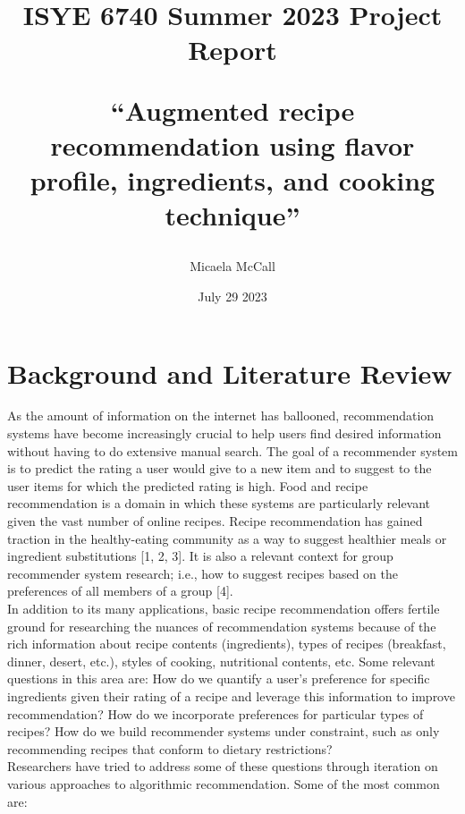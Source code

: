 \documentclass{article}
\begin{document}
\title{ISYE 6740 Summer 2023 Project Report 

``Augmented recipe recommendation using flavor profile, ingredients, and cooking technique''}
\author{Micaela McCall}
\date{July 29 2023}
\maketitle

\tableofcontents
\pagebreak

\section{Background and Literature Review}

As the amount of information on the internet has ballooned, recommendation systems have become increasingly crucial to help users find desired information without having to do extensive manual search. The goal of a recommender system is to predict the rating a user would give to a new item and to suggest to the user items for which the predicted rating is high. Food and recipe recommendation is a domain in which these systems are particularly relevant given the vast number of online recipes. Recipe recommendation has gained traction in the healthy-eating community as a way to suggest healthier meals or ingredient substitutions [1, 2, 3]. It is also a relevant context for group recommender system research; i.e., how to suggest recipes based on the preferences of all members of a group [4]. %
\vspace{0.1in}
\\
In addition to its many applications, basic recipe recommendation  offers fertile ground for researching the nuances of recommendation systems because of the rich information about recipe contents (ingredients), types of recipes (breakfast, dinner, desert, etc.), styles of cooking, nutritional contents, etc.  Some relevant questions in this area are: How do we quantify a user's preference for specific ingredients given their rating of a recipe and leverage this information to improve recommendation? How do we incorporate preferences for particular types of recipes? How do we build recommender systems under constraint, such as only recommending recipes that conform to dietary restrictions?
\vspace{0.1in}
\\
Researchers have tried to address some of these questions through iteration on various approaches to algorithmic recommendation. Some of the most common are: 
\vspace{0.1in}
\end{document}
